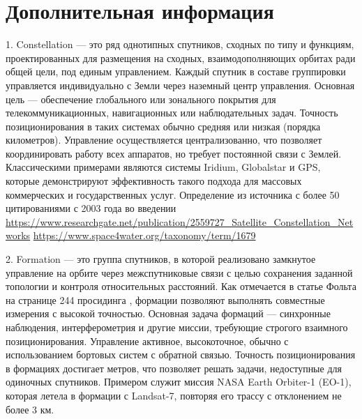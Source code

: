 \section{Дополнительная информация}
\label{sec:additional-information}

1. Constellation — это ряд однотипных спутников, сходных по типу и функциям, 
проектированных для размещения на сходных, взаимодополняющих орбитах ради 
общей цели, под единым управлением. Каждый спутник в составе группировки управляется 
индивидуально с Земли через наземный центр управления. Основная цель — 
обеспечение глобального или зонального покрытия для телекоммуникационных, навигационных 
или наблюдательных задач. Точность позиционирования в таких системах обычно средняя или 
низкая (порядка километров). Управление осуществляется централизованно, что позволяет 
координировать работу всех аппаратов, но требует постоянной связи с Землей. 
Классическими примерами являются системы Iridium, Globalstar и GPS, 
которые демонстрируют эффективность такого подхода для массовых коммерческих 
и государственных услуг.
Определение из источника с более 50 цитированиями с 2003 года во введении
\url{https://www.researchgate.net/publication/2559727_Satellite_Constellation_Networks}
\url{https://www.space4water.org/taxonomy/term/1679}

2. Formation — это группа спутников, в которой реализовано замкнутое управление 
на орбите через межспутниковые связи с целью сохранения заданной 
топологии и контроля относительных расстояний. Как отмечается в статье Фольта 
на странице 244 просидинга \cite{van_der_Ha_1998}, формации позволяют выполнять 
совместные измерения с высокой точностью. 
Основная задача формаций — синхронные наблюдения, интерферометрия и другие миссии, 
требующие строгого взаимного позиционирования. Управление активное, высокоточное, 
обычно с использованием бортовых систем с обратной связью. Точность позиционирования 
в формациях достигает метров, что позволяет решать задачи, недоступные для одиночных 
спутников. Примером служит миссия NASA Earth Orbiter-1 (EO-1), которая летела в 
формации с Landsat-7, повторяя его трассу с отклонением не более 3 км.

